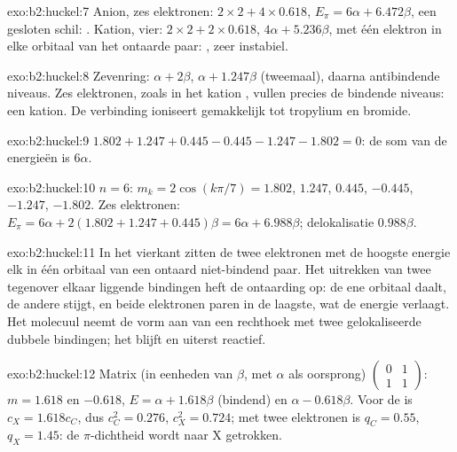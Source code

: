 \begin{solution}{exo:b2:huckel:7}
Anion, zes elektronen: $2 \times 2 + 4 \times 0.618$, $E_\pi = 6\alpha + 6.472\beta$, een gesloten schil:
. Kation, vier: $2 \times 2 + 2 \times 0.618$, $4\alpha + 5.236\beta$, met één elektron
in elke orbitaal van het ontaarde paar: , zeer instabiel.
\end{solution}

\begin{solution}{exo:b2:huckel:8}
Zevenring: $\alpha + 2\beta$, $\alpha + 1.247\beta$ (tweemaal), daarna antibindende niveaus. Zes
elektronen, zoals in het kation , vullen precies de bindende niveaus: een 
kation. De verbinding ioniseert gemakkelijk tot tropylium en bromide.
\end{solution}

\begin{solution}{exo:b2:huckel:9}
$1.802 + 1.247 + 0.445 - 0.445 - 1.247 - 1.802 = 0$: de som van de energieën is $6\alpha$.
\end{solution}

\begin{solution}{exo:b2:huckel:10}
$n = 6$: $m_k = 2\cos(k\pi/7) = 1.802$, $1.247$, $0.445$, $-0.445$, $-1.247$, $-1.802$. Zes
elektronen: $E_\pi = 6\alpha + 2(1.802 + 1.247 + 0.445)\beta = 6\alpha + 6.988\beta$;
delokalisatie $0.988\beta$.
\end{solution}

\begin{solution}{exo:b2:huckel:11}
In het vierkant zitten de twee elektronen met de hoogste energie elk in één orbitaal van een
ontaard niet-bindend paar. Het uitrekken van twee tegenover elkaar liggende bindingen heft de ontaarding op:
de ene orbitaal daalt, de andere stijgt, en beide elektronen paren in de laagste, wat
de energie verlaagt. Het molecuul neemt de vorm aan van een rechthoek met twee gelokaliseerde dubbele
bindingen; het blijft  en uiterst reactief.
\end{solution}

\begin{solution}{exo:b2:huckel:12}
Matrix (in eenheden van $\beta$, met $\alpha$ als oorsprong) $\begin{pmatrix}0 & 1\\ 1 & 1\end{pmatrix}$:
$m = 1.618$ en $-0.618$, $E = \alpha + 1.618\beta$ (bindend) en $\alpha - 0.618\beta$. Voor de
 is $c_X = 1.618c_C$, dus $c_C^2 = 0.276$, $c_X^2 = 0.724$; met twee elektronen
is $q_C = 0.55$, $q_X = 1.45$: de $\pi$-dichtheid wordt naar X getrokken.
\end{solution}

